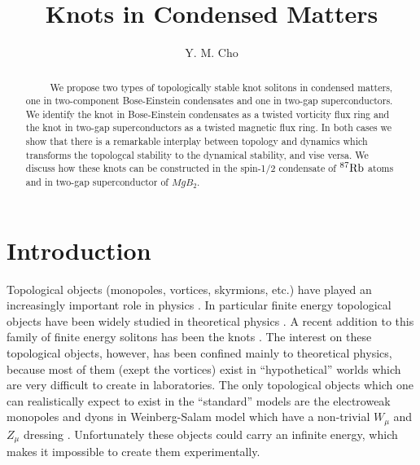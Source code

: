 \documentclass[twocolumn,showpacs,showkeys]{revtex4}
\begin{document}
\title{Knots in Condensed Matters}
\author{Y. M. Cho}
\begin{abstract}
~~~~~We propose two types of topologically stable knot solitons 
in condensed matters, one in two-component
Bose-Einstein condensates and one in two-gap superconductors. 
We identify the knot in Bose-Einstein condensates as
a twisted vorticity flux ring and the knot in two-gap superconductors
as a twisted magnetic flux ring.
In both cases we show that there is a remarkable interplay between
topology and dynamics which transforms the topologcal stability
to the dynamical stability, and vise versa.  
We discuss how these knots can be constructed in the spin-1/2 
condensate of $^{87}{\rm Rb}$ atoms and in two-gap superconductor
of $MgB_2$.
\end{abstract}
\maketitle


\section{Introduction}

Topological objects (monopoles, vortices, skyrmions, etc.) 
have played an increasingly important role
in physics \cite{dirac,abri}. In particular finite energy topological
objects have been widely studied in theoretical physics
\cite{skyrme,thooft}. A recent addition to this family of finite
energy solitons has been the knots \cite{fadd1,prl01}.
The interest on these topological objects,
however, has been confined mainly to theoretical physics, 
because most of them (exept the vortices) exist in
``hypothetical'' worlds which are very difficult to
create in laboratories. The only
topological objects which one can realistically expect to exist
in the ``standard'' models are the electroweak 
monopoles and dyons in Weinberg-Salam model
which have a non-trivial $W_\mu$
and $Z_\mu$ dressing \cite{plb97,yang}. Unfortunately these objects
could carry an infinite energy, which makes it impossible to
create them experimentally.
\end{document}
